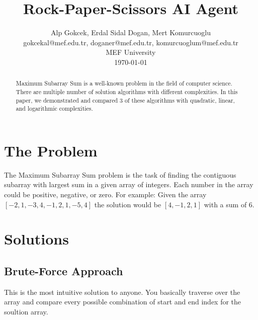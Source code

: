 \documentclass[twocolumns]{IEEEtran}
\author{Alp Gokcek, Erdal Sidal Dogan, Mert Komurcuoglu\\gokcekal@mef.edu.tr, doganer@mef.edu.tr, komurcuoglum@mef.edu.tr\\ MEF University \\ \today}
\title{Rock-Paper-Scissors AI Agent}
\begin{document}
	\maketitle
	\begin{abstract}
		Maximum Subarray Sum is a well-known problem in the field of computer science. There are multiple number of solution algorithms with different complexities. In this paper, we demonstrated and compared 3 of these algorithms with quadratic, linear, and logarithmic complexities.
	\end{abstract}
\section{The Problem}
The Maximum Subarray Sum problem is the task of finding the contiguous subarray with largest sum in a given array of integers. Each number in the array could be positive, negative, or zero. For example: Given the array $[-2, 1, -3, 4, -1, 2, 1, -5, 4]$ the solution would be $[4, -1, 2, 1]$ with a sum of 6.
\section{Solutions}
\subsection{Brute-Force Approach}
This is the most intuitive solution to anyone. You basically traverse over the array and compare every possible combination of start and end index for the soultion array.\\ \\
\end{document}

